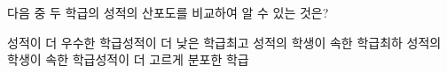다음 중 두 학급의 성적의 산포도를 비교하여 알 수 있는 것은?
\begin{choicesv}{성적이 더 우수한 학급}{성적이 더 낮은 학급}{최고 성적의 학생이 속한 학급}{최하 성적의 학생이 속한 학급}{성적이 더 고르게 분포한 학급}\end{choicesv}

